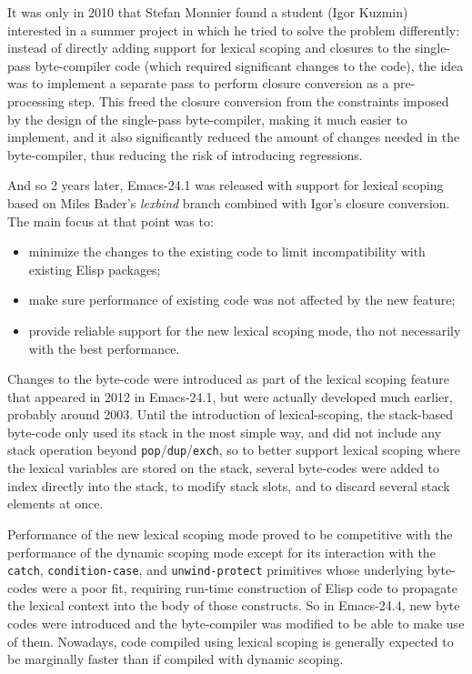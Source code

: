 \documentclass[format=acmsmall, review=false, screen=true]{acmart}
\newcommand \Elisp {Elisp}
\begin{document}
It was only in 2010 that Stefan Monnier found a student (Igor Kuzmin)
interested in a summer project in which he tried to solve the problem
differently: instead of directly adding support for lexical scoping and
closures to the single-pass byte-compiler code (which required significant
changes to the code), the idea was to implement a separate pass to perform
closure conversion as a pre-processing step.  This freed the closure
conversion from the constraints imposed by the design of the single-pass
byte-compiler, making it much easier to implement, and it also significantly
reduced the amount of changes needed in the byte-compiler, thus reducing the
risk of introducing regressions.

And so 2 years later, Emacs-24.1 was released with support for lexical
scoping based on Miles Bader's \emph{lexbind} branch combined with Igor's
closure conversion.  The main focus at that point was to:
\begin{itemize}
\item minimize the changes to the existing code to limit incompatibility
  with existing \Elisp{} packages;
\item make sure performance of existing code was not affected by the
  new feature;
\item provide reliable support for the new lexical scoping mode, tho not
  necessarily with the best performance.
\end{itemize}
%
Changes to the byte-code were introduced as part of the lexical scoping
feature that appeared in 2012 in Emacs-24.1, but were actually developed
much earlier, probably around 2003.  Until the introduction of
lexical-scoping, the stack-based byte-code only used its stack in the most
simple way, and did not include any stack operation beyond
\texttt{pop}/\texttt{dup}/\texttt{exch}, so to better support lexical
scoping where the lexical variables are stored on the stack, several
byte-codes were added to index directly into the stack, to modify stack
slots, and to discard several stack elements at once.

Performance of the new lexical scoping mode proved to be competitive with
the performance of the dynamic scoping mode except for its interaction with
the \texttt{catch}, \texttt{condition-case}, and \texttt{unwind-protect}
primitives whose underlying byte-codes were a poor fit, requiring run-time
construction of \Elisp{} code to propagate the lexical context into the body
of those constructs.
So in Emacs-24.4, new byte codes were introduced and
the byte-compiler was modified to be able to make use of them.  Nowadays,
code compiled using lexical scoping is generally expected to be marginally
faster than if compiled with dynamic scoping.
\end{document}
